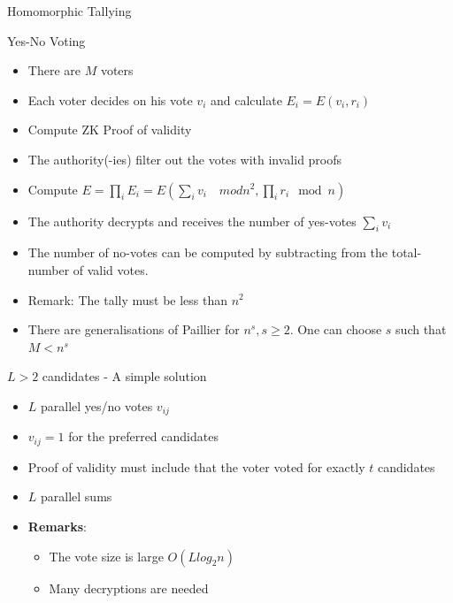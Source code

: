 \documentclass{beamer}
\begin{document}
\begin{frame}[allowframebreaks]{Homomorphic Tallying \cite{Damgard03ageneralization}}
\begin{block}{Yes-No Voting}
\begin{itemize}
\item There are $M$ voters
\item Each voter decides on his vote $v_i$ and calculate $E_i = E(v_i,r_i)$
\item Compute ZK Proof of validity
\item The authority(-ies) filter out the votes with invalid proofs
\item Compute $E=\prod_{i}E_i=E(\sum_{i}v_i \quad mod n^2, \prod_{i}r_i \mod n)$
\item The authority decrypts and receives the number of yes-votes $\sum_{i}v_i $
\item The number of no-votes can be computed by subtracting from the total-number of valid votes.
\item Remark: The tally must be less than $n^2$
\item There are generalisations of Paillier for $n^s, s \geq 2$. One can choose $s$ such that $M<n^s$
\end{itemize}
\end{block}

\begin{block}{$L>2$ candidates - A simple solution}
\begin{itemize}
\item $L$ parallel yes/no votes $v_{ij}$
\item $v_{ij} = 1$ for the preferred candidates
\item Proof of validity must include that the voter voted for exactly $t$ candidates
\item $L$ parallel sums
\item \textbf{Remarks}: 
\begin{itemize}
\item The vote size is large $O(L  log_{2}n)$
\item Many decryptions are needed
\end{itemize}
\end{itemize}
\end{block}


\end{frame}
\end{document}
